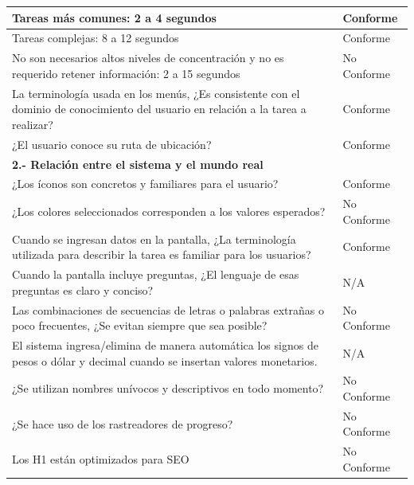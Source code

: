 \documentclass[stu, 12pt, letterpaper, donotrepeattitle, floatsintext, natbib]{apa7}
\begin{document}
\begin{longtable}{|>{\raggedright\arraybackslash}p{10cm}|>{\centering\arraybackslash}p{3cm}|}
    Tareas más comunes: 2 a 4 segundos & Conforme \\ \hline
    Tareas complejas: 8 a 12 segundos & Conforme \\ \hline
    No son necesarios altos niveles de concentración y no es requerido retener información: 2 a 15 segundos & No Conforme\\ \hline
    La terminología usada en los menús, ¿Es consistente con el dominio de conocimiento del usuario en relación a la tarea a realizar? & Conforme \\ \hline
    ¿El usuario conoce su ruta de ubicación? & Conforme \\ \hline
    
    \textbf{2.- Relación entre el sistema y el mundo real} & \\ \hline
    ¿Los íconos son concretos y familiares para el usuario? & Conforme \\ \hline
    ¿Los colores seleccionados corresponden a los valores esperados? & No Conforme \\ \hline
    Cuando se ingresan datos en la pantalla, ¿La terminología utilizada para describir la tarea es familiar para los usuarios? & Conforme \\ \hline
    Cuando la pantalla incluye preguntas, ¿El lenguaje de esas preguntas es claro y conciso? & N/A \\ \hline
    Las combinaciones de secuencias de letras o palabras extrañas o poco frecuentes, ¿Se evitan siempre que sea posible? & No Conforme\\ \hline
    El sistema ingresa/elimina de manera automática los signos de pesos o dólar y decimal cuando se insertan valores monetarios. & N/A\\ \hline
    ¿Se utilizan nombres unívocos y descriptivos en todo momento? & No Conforme \\ \hline
    ¿Se hace uso de los rastreadores de progreso? & No Conforme\\ \hline
    Los H1 están optimizados para SEO & No Conforme \\ \hline
    

\end{longtable}
\end{document}
